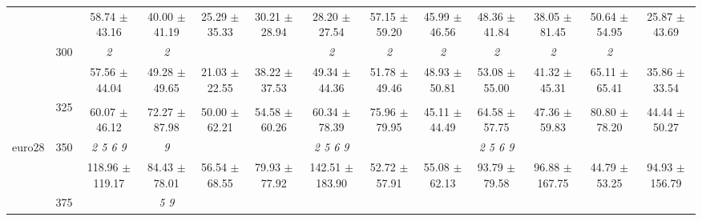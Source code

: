 \begin{table}[h]
{\begin{tabular}{
        ccccccccccccc}
 & & \cellcolor[HTML]{EFEFEF} 58.74 $\pm$ 43.16& \cellcolor[HTML]{EFEFEF} 40.00 $\pm$ 41.19& \cellcolor[HTML]{EFEFEF} 25.29 $\pm$ 35.33& \cellcolor[HTML]{EFEFEF} 30.21 $\pm$ 28.94& \cellcolor[HTML]{EFEFEF} 28.20 $\pm$ 27.54& \cellcolor[HTML]{EFEFEF} 57.15 $\pm$ 59.20& \cellcolor[HTML]{EFEFEF} 45.99 $\pm$ 46.56& \cellcolor[HTML]{EFEFEF} 48.36 $\pm$ 41.84& \cellcolor[HTML]{EFEFEF} 38.05 $\pm$ 81.45& \cellcolor[HTML]{EFEFEF} 50.64 $\pm$ 54.95& \cellcolor[HTML]{EFEFEF} 25.87 $\pm$ 43.69 \\ 
 & \multirow{2}{*}{300}& \textit{ 2 }& \textit{ 2 }& & & \textit{ 2 }& \textit{ 2 }& \textit{ 2 }& \textit{ 2 }& \textit{ 2 }& \textit{ 2 }&  \\ 
 & & 57.56 $\pm$ 44.04& 49.28 $\pm$ 49.65& 21.03 $\pm$ 22.55& 38.22 $\pm$ 37.53& 49.34 $\pm$ 44.36& 51.78 $\pm$ 49.46& 48.93 $\pm$ 50.81& 53.08 $\pm$ 55.00& 41.32 $\pm$ 45.31& 65.11 $\pm$ 65.41& 35.86 $\pm$ 33.54 \\ 
 & \multirow{2}{*}{325}& \cellcolor[HTML]{EFEFEF} & \cellcolor[HTML]{EFEFEF} & \cellcolor[HTML]{EFEFEF} & \cellcolor[HTML]{EFEFEF} & \cellcolor[HTML]{EFEFEF} & \cellcolor[HTML]{EFEFEF} & \cellcolor[HTML]{EFEFEF} & \cellcolor[HTML]{EFEFEF} & \cellcolor[HTML]{EFEFEF} & \cellcolor[HTML]{EFEFEF} & \cellcolor[HTML]{EFEFEF}  \\ 
 & & \cellcolor[HTML]{EFEFEF} 60.07 $\pm$ 46.12& \cellcolor[HTML]{EFEFEF} 72.27 $\pm$ 87.98& \cellcolor[HTML]{EFEFEF} 50.00 $\pm$ 62.21& \cellcolor[HTML]{EFEFEF} 54.58 $\pm$ 60.26& \cellcolor[HTML]{EFEFEF} 60.34 $\pm$ 78.39& \cellcolor[HTML]{EFEFEF} 75.96 $\pm$ 79.95& \cellcolor[HTML]{EFEFEF} 45.11 $\pm$ 44.49& \cellcolor[HTML]{EFEFEF} 64.58 $\pm$ 57.75& \cellcolor[HTML]{EFEFEF} 47.36 $\pm$ 59.83& \cellcolor[HTML]{EFEFEF} 80.80 $\pm$ 78.20& \cellcolor[HTML]{EFEFEF} 44.44 $\pm$ 50.27 \\ 
 \multirow{4}{*}{euro28} & \multirow{2}{*}{350}& \textit{ 2 5 6 9 }& \textit{ 9 }& & & \textit{ 2 5 6 9 }& & & \textit{ 2 5 6 9 }& & &  \\ 
 & & 118.96 $\pm$ 119.17& 84.43 $\pm$ 78.01& 56.54 $\pm$ 68.55& 79.93 $\pm$ 77.92& 142.51 $\pm$ 183.90& 52.72 $\pm$ 57.91& 55.08 $\pm$ 62.13& 93.79 $\pm$ 79.58& 96.88 $\pm$ 167.75& 44.79 $\pm$ 53.25& 94.93 $\pm$ 156.79 \\ 
 & \multirow{2}{*}{375}& \cellcolor[HTML]{EFEFEF} & \cellcolor[HTML]{EFEFEF} \textit{ 5 9 }& \cellcolor[HTML]{EFEFEF} & \cellcolor[HTML]{EFEFEF} & \cellcolor[HTML]{EFEFEF} & \cellcolor[HTML]{EFEFEF} & \cellcolor[HTML]{EFEFEF} & \cellcolor[HTML]{EFEFEF} & \cellcolor[HTML]{EFEFEF} & \cellcolor[HTML]{EFEFEF} & \cellcolor[HTML]{EFEFEF}  \\ 

\end{tabular}}
\end{table}
